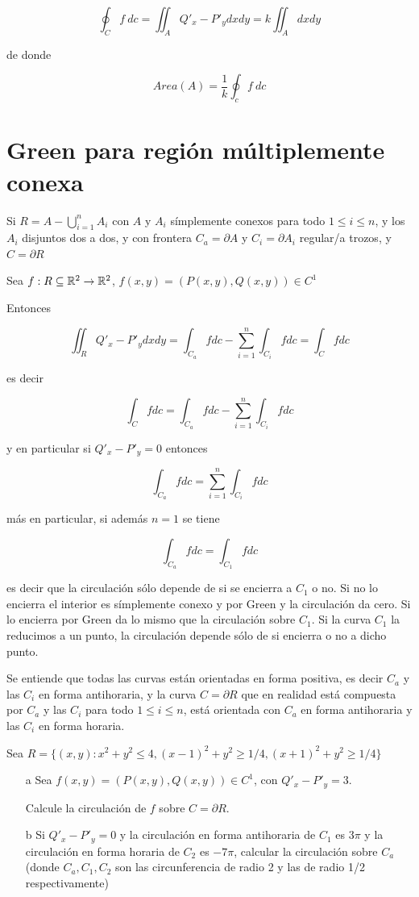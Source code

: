 $$ \oint_C f \ dc = \iint_A Q'_x - P'_y dxdy = k \iint_A dxdy $$

de donde

$$ Area(A) = \frac{1}{k} \oint_c f \ dc $$

\section{Green para región múltiplemente conexa}

Si $R = A - \bigcup_{i=1}^n A_i $ con $A$ y $A_i$ símplemente conexos para todo $1 \leq i \leq n$, y los $A_i$ disjuntos dos a dos, y con frontera $C_a = \partial A$ y $C_i = \partial A_i$ regular/a trozos, y $C = \partial R$

Sea $f : R \subseteq \mathbb{R}^2 \to \mathbb{R}^2$, $f(x,y) = (P(x,y), Q(x,y)) \in C^1 $

Entonces

$$ \iint_R Q'_x - P'_y dxdy = \int_{C_a} f dc - \sum_{i=1}^n \int_{C_i} f dc = \int_C f dc $$

es decir

$$\int_C f dc = \int_{C_a} f dc - \sum_{i=1}^n \int_{C_i} f dc $$

y en particular si $Q'_x - P'_y = 0$ entonces

$$ \int_{C_a} f dc = \sum_{i=1}^n \int_{C_i} f dc $$

más en particular, si además $n=1$ se tiene

$$ \int_{C_a} f dc = \int_{C_1} f dc $$

es decir que la circulación sólo depende de si se encierra a $C_1$ o no.  Si no lo encierra el interior es símplemente conexo y por Green y la circulación da cero.  Si lo encierra por Green da lo mismo que la circulación sobre $C_1$.  Si la curva $C_1$ la reducimos a un punto, la circulación depende sólo de si encierra o no a dicho punto.

Se entiende que todas las curvas están orientadas en forma positiva, es decir $C_a$ y las $C_i$ en forma antihoraria, y la curva $C = \partial R$ que en realidad está compuesta por $C_a$ y las $C_i$ para todo $1 \leq i \leq n$, está orientada con $C_a$ en forma antihoraria y las $C_i$ en forma horaria.

\begin{example}
Sea $R = \{ (x,y) : x^2 + y^2 \leq 4, (x-1)^2 + y^2 \geq 1/4, (x+1)^2 + y^2 \geq 1/4 \}$

\begin{itemize}
\item[a] Sea $f(x,y) = (P(x,y), Q(x,y)) \in C^1$, con $Q'_x - P'_y = 3$.

Calcule la circulación de $f$ sobre $C = \partial R$.

\item[b] Si $Q'_x - P'_y = 0$ y la circulación en forma antihoraria de $C_1$ es $3\pi$ y la circulación en forma horaria de $C_2$ es $-7 \pi$, calcular la circulación sobre $C_a$ (donde $C_a, C_1, C_2$ son las circunferencia de radio 2 y las de radio 1/2 respectivamente)

\end{itemize}

\end{example}

